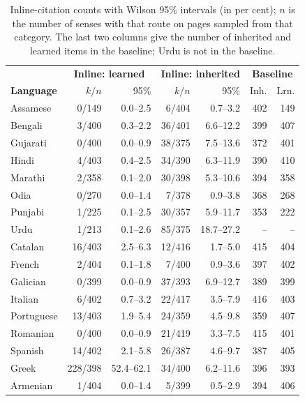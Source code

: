 \documentclass[11pt]{article}
\begin{document}
\begin{table}[h]
\centering\footnotesize
\setlength{\tabcolsep}{1.2pt}
\begin{tabular}{lrrrrrr}
\toprule
& \multicolumn{2}{c}{\textbf{Inline: learned}} & \multicolumn{2}{c}{\textbf{Inline: inherited}} & \multicolumn{2}{c}{\textbf{Baseline}} \\
\textbf{Language} & $k/n$ & 95\% & $k/n$ & 95\% & Inh. & Lrn. \\
\midrule
Assamese & 0/149 & 0.0--2.5 & 6/404 & 0.7--3.2 & 402 & 149 \\
Bengali & 3/400 & 0.3--2.2 & 36/401 & 6.6--12.2 & 399 & 407 \\
Gujarati & 0/400 & 0.0--0.9 & 38/375 & 7.5--13.6 & 372 & 401 \\
Hindi & 4/403 & 0.4--2.5 & 34/390 & 6.3--11.9 & 390 & 410 \\
Marathi & 2/358 & 0.1--2.0 & 30/398 & 5.3--10.6 & 394 & 358 \\
Odia & 0/270 & 0.0--1.4 & 7/378 & 0.9--3.8 & 368 & 268 \\
Punjabi & 1/225 & 0.1--2.5 & 30/357 & 5.9--11.7 & 353 & 222 \\
Urdu & 1/213 & 0.1--2.6 & 85/375 & 18.7--27.2 & -- & -- \\
\midrule
Catalan & 16/403 & 2.5--6.3 & 12/416 & 1.7--5.0 & 415 & 404 \\
French & 2/404 & 0.1--1.8 & 7/400 & 0.9--3.6 & 397 & 402 \\
Galician & 0/399 & 0.0--0.9 & 37/393 & 6.9--12.7 & 389 & 399 \\
Italian & 6/402 & 0.7--3.2 & 22/417 & 3.5--7.9 & 416 & 403 \\
Portuguese & 13/403 & 1.9--5.4 & 24/359 & 4.5--9.8 & 359 & 407 \\
Romanian & 0/400 & 0.0--0.9 & 21/419 & 3.3--7.5 & 415 & 401 \\
Spanish & 14/402 & 2.1--5.8 & 26/387 & 4.6--9.7 & 387 & 405 \\
\midrule
Greek & 228/398 & 52.4--62.1 & 34/400 & 6.2--11.6 & 396 & 393 \\
\midrule
Armenian & 1/404 & 0.0--1.4 & 5/399 & 0.5--2.9 & 394 & 406 \\
\bottomrule
\end{tabular}
\caption{Inline-citation counts with Wilson 95\% intervals (in per cent); $n$ is the number of senses with that route on pages sampled from that category. The last two columns give the number of inherited and learned items in the baseline; Urdu is not in the baseline.}
\label{tab:denominators}
\end{table}
\end{document}
